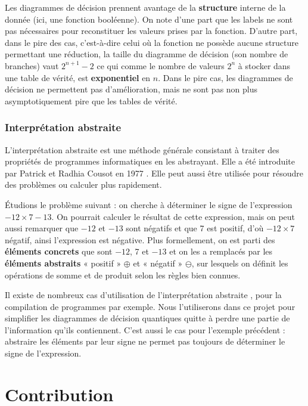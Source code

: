 Les diagrammes de décision prennent avantage de la \textbf{structure} interne de la donnée (ici, une fonction booléenne). On note d'une part que les labels ne sont pas nécessaires pour reconstituer les valeurs prises par la fonction.
D'autre part, dans le pire des cas, c'est-à-dire celui où la fonction ne possède aucune structure permettant une réduction, la taille du diagramme de décision (son nombre de branches) vaut $2^{n+1} - 2$ ce qui comme le nombre de valeurs $2^n$ à stocker dans une table de vérité, est \textbf{exponentiel} en $n$. Dans le pire cas, les diagrammes de décision ne permettent pas d'amélioration, mais ne sont pas non plus asymptotiquement pire que les tables de vérité.


\subsubsection*{Interprétation abstraite}

L'interprétation abstraite est une méthode générale consistant à traiter des propriétés de programmes informatiques en les abstrayant. Elle a été introduite par Patrick et Radhia Cousot en 1977 \cite{CousotCousot77-1}. Elle peut aussi être utilisée pour résoudre des problèmes ou calculer plus rapidement.

Étudions le problème suivant : on cherche à déterminer le signe de  l'expression $-12 \times 7 - 13$. On pourrait calculer le résultat de cette expression, mais on peut aussi remarquer que $-12$ et $-13$ sont négatifs et que 7 est positif, d'où $-12 \times 7$ négatif, ainsi l'expression est négative. Plus formellement, on est parti des \textbf{éléments concrets} que sont $-12$, 7 et $-13$ et on les a remplacés par les \textbf{éléments abstraits} « positif » $\oplus$ et « négatif » $\ominus$, sur lesquels on définit les opérations de somme et de produit selon les règles bien connues.

Il existe de nombreux cas d'utilisation de l'interprétation abstraite \cite{Rosendahl_1995}, pour la compilation de programmes par exemple. Nous l'utiliserons dans ce projet pour simplifier les diagrammes de décision quantiques quitte à perdre une partie de l'information qu'ils contiennent. C'est aussi le cas pour l'exemple précédent : abstraire les éléments par leur signe ne permet pas toujours de déterminer le signe de l'expression.


\section{Contribution}
\label{sec:Contribution}

